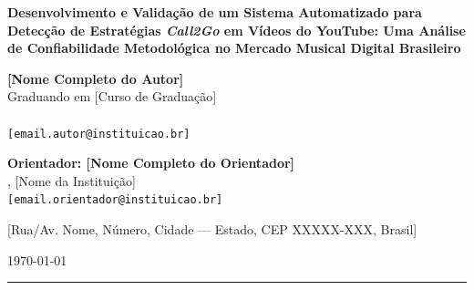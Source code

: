 \documentclass[12pt, a4paper]{article}
\begin{document}
\begin{center}
{\large\bfseries
Desenvolvimento e Validação de um Sistema Automatizado para Detecção de Estratégias \textit{Call2Go} em Vídeos do YouTube: Uma Análise de Confiabilidade Metodológica no Mercado Musical Digital Brasileiro}

\vspace{0.9cm}

{\normalsize
\textbf{[Nome Completo do Autor]}\\
Graduando em [Curso de Graduação]\\
[Nome da Instituição de Ensino Superior]\\
\texttt{[email.autor@instituicao.br]}}

\vspace{0.5cm}

{\normalsize
\textbf{Orientador: [Nome Completo do Orientador]}\\
[Departamento / Curso], [Nome da Instituição]\\
\texttt{[email.orientador@instituicao.br]}}

\vspace{0.4cm}

{\small [Rua/Av. Nome, Número, Cidade --- Estado, CEP XXXXX-XXX, Brasil]}

\vspace{0.2cm}
{\small \today}
\end{center}

\vspace{0.4cm}
\hrule
\vspace{0.5cm}
\end{document}
